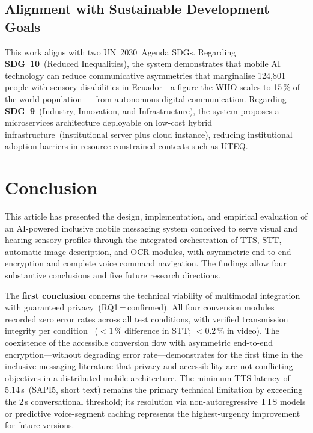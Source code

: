 \documentclass[journal]{IEEEtran}
\begin{document}
	\subsection{Alignment with Sustainable Development Goals}
	This work aligns with two UN~2030~Agenda SDGs.
	Regarding \textbf{SDG~10}~(Reduced Inequalities), the system
	demonstrates that mobile AI technology can reduce communicative
	asymmetries that marginalise 124{,}801 people with sensory
	disabilities in Ecuador---a figure the WHO scales to 15\,\% of
	the world population~\cite{who2011}---from autonomous digital
	communication.
	Regarding \textbf{SDG~9}~(Industry, Innovation, and
	Infrastructure), the system proposes a microservices architecture
	deployable on low-cost hybrid infrastructure~(institutional server
	plus cloud instance), reducing institutional adoption barriers in
	resource-constrained contexts such as UTEQ.
	
	\section{Conclusion}
	\label{sec:conclusion}
	This article has presented the design, implementation, and empirical
	evaluation of an AI-powered inclusive mobile messaging system
	conceived to serve visual and hearing sensory profiles through the
	integrated orchestration of TTS, STT, automatic image description,
	and OCR modules, with asymmetric end-to-end encryption and complete
	voice command navigation.
	The findings allow four substantive conclusions and five future
	research directions.
	
	The \textbf{first conclusion} concerns the technical viability of
	multimodal integration with guaranteed privacy~(RQ1\,=\,confirmed).
	All four conversion modules recorded zero error rates across all
	test conditions, with verified transmission integrity per condition
	~($<1\,\%$ difference in STT; $<0.2\,\%$ in video).
	The coexistence of the accessible conversion flow with asymmetric
	end-to-end encryption---without degrading error rate---demonstrates
	for the first time in the inclusive messaging literature that
	privacy and accessibility are not conflicting objectives in a
	distributed mobile architecture.
	The minimum TTS latency of 5.14\,s~(SAPI5, short text) remains
	the primary technical limitation by exceeding the 2\,s conversational
	threshold; its resolution via non-autoregressive TTS models or
	predictive voice-segment caching represents the highest-urgency
	improvement for future versions.
	
\end{document}

